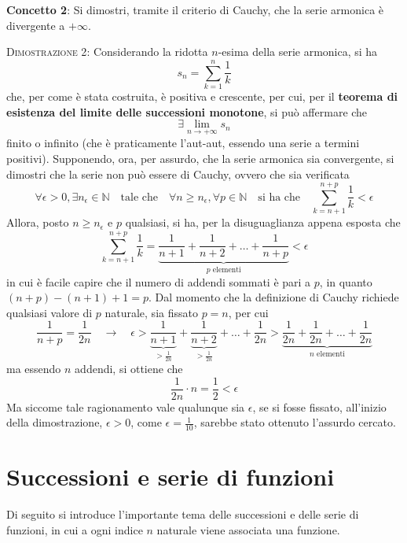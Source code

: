 \documentclass[a4paper]{extarticle}
\begin{document}
\newpage
\noindent
\textbf{Concetto 2}: Si dimostri, tramite il criterio di Cauchy, che la serie armonica è divergente a $+\infty$.

\vspace{2em}
\noindent
\normalfont \normalsize
\textsc{Dimostrazione 2}: Considerando la ridotta $n$-esima della serie armonica, si ha
\[s_n = \sum_{k=1}^{n} \frac{1}{k}\]
che, per come è stata costruita, è positiva e crescente, per cui, per il \textbf{teorema di esistenza del limite delle successioni monotone}, si può affermare che
\[\exists \lim_{n \to + \infty} s_n\] 
finito o infinito (che è praticamente l'aut-aut, essendo una serie a termini positivi). Supponendo, ora, per assurdo, che la serie armonica sia convergente, si dimostri che la serie non può essere di Cauchy, ovvero che sia verificata
\[\forall \epsilon > 0, \exists n_\epsilon \in \mathbb{N} \hspace{1em} \text{tale che} \hspace{1em} \forall n \geq n_\epsilon, \forall p \in \mathbb{N} \hspace{1em} \text{si ha che} \hspace{1em} \sum_{k=n+1}^{n+p} \frac{1}{k} < \epsilon\]
Allora, posto $n \geq n_\epsilon$ e $p$ qualsiasi, si ha, per la disuguaglianza appena esposta che
\[\sum_{k=n+1}^{n+p} \frac{1}{k} = \underbrace{\frac{1}{n+1} + \frac{1}{n+2} + \dots + \frac{1}{n+p}}_{p\text{ elementi}} < \epsilon\]
in cui è facile capire che il numero di addendi sommati è pari a $p$, in quanto $(n+p)-(n+1)+1=p$. Dal momento che la definizione di Cauchy richiede qualsiasi valore di $p$ naturale, sia fissato $p=n$, per cui
\[\frac{1}{n+p}=\frac{1}{2n} \hspace{1em} \rightarrow \hspace{1em} \epsilon > \underbrace{\frac{1}{n+1}}_{>\frac{1}{2n}} + \underbrace{\frac{1}{n+2}}_{>\frac{1}{2n}} + \dots + \frac{1}{2n} > \underbrace{\frac{1}{2n}+\frac{1}{2n}+\dots+\frac{1}{2n}}_{n\text{ elementi}}\]
ma essendo $n$ addendi, si ottiene che
\[\frac{1}{2n} \cdot n = \frac{1}{2} < \epsilon\]
Ma siccome tale ragionamento vale qualunque sia $\epsilon$, se si fosse fissato, all'inizio della dimostrazione, $\epsilon>0$, come $\epsilon=\frac{1}{10}$, sarebbe stato ottenuto l'assurdo cercato.

\newpage
\section{Successioni e serie di funzioni}
Di seguito si introduce l'importante tema delle successioni e delle serie di funzioni, in cui a ogni indice $n$ naturale viene associata una funzione.
\end{document}
